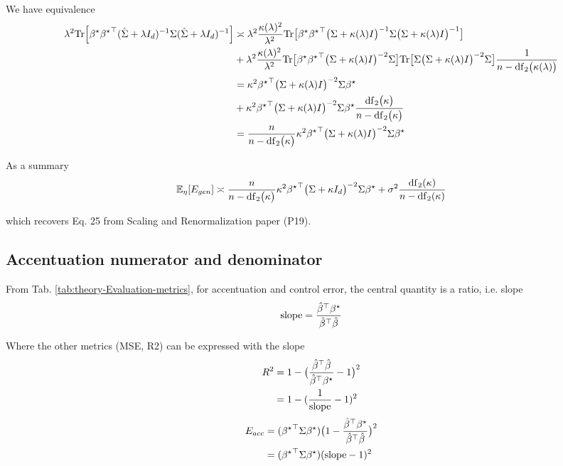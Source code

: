 \begin{minipage}[t]{1\columnwidth}
We have equivalence
\begin{align*}
\lambda^{2}\mathrm{Tr}\Big[{\beta^{\star}}{{\beta^{\star}}}^{\top}(\hat{\Sigma}+\lambda I_{d})^{-1}\Sigma(\hat{\Sigma}+\lambda I_{d})^{-1}\Big] & \asymp\lambda^{2}\frac{\kappa(\lambda)^{2}}{\lambda^{2}\,}\mbox{Tr}\bigl[{\beta^{\star}}{{\beta^{\star}}}^{\top}\bigl(\Sigma+\kappa(\lambda)I\bigr)^{-1}\Sigma\bigl(\Sigma+\kappa(\lambda)I\bigr)^{-1}\bigr]\\
 & +\lambda^{2}\frac{\kappa(\lambda)^{2}}{\lambda^{2}}\mbox{Tr}\bigl[{\beta^{\star}}{{\beta^{\star}}}^{\top}\bigl(\Sigma+\kappa(\lambda)I\bigr)^{-2}\Sigma\bigr]\mbox{Tr}\bigl[\Sigma\bigl(\Sigma+\kappa(\lambda)I\bigr)^{-2}\Sigma\bigr]\frac{1}{n-\mathrm{df}_{2}\bigl(\kappa(\lambda)\bigr)}\\
 & =\kappa^{2}{{\beta^{\star}}}^{\top}\bigl(\Sigma+\kappa(\lambda)I\bigr)^{-2}\Sigma{\beta^{\star}}\\
 & +\kappa^{2}{{\beta^{\star}}}^{\top}\bigl(\Sigma+\kappa(\lambda)I\bigr)^{-2}\Sigma{\beta^{\star}}\frac{\mathrm{df}_{2}\bigl(\kappa\bigr)}{n-\mathrm{df}_{2}\bigl(\kappa\bigr)}\\
 & =\frac{n}{n-\mathrm{df}_{2}\bigl(\kappa\bigr)}\kappa^{2}{{\beta^{\star}}}^{\top}\bigl(\Sigma+\kappa(\lambda)I\bigr)^{-2}\Sigma{\beta^{\star}}
\end{align*}

As a summary
\[
\mathbb{E}_{\eta}[E_{gen}]\asymp\frac{n}{n-\mathrm{df}_{2}\bigl(\kappa\bigr)}\kappa^{2}{{\beta^{\star}}}^{\top}\bigl(\Sigma+\kappa I_{d}\bigr)^{-2}\Sigma{\beta^{\star}}+\sigma^{2}\frac{\mathrm{df}_{2}(\kappa)}{n-\mathrm{df}_{2}(\kappa)}
\]

which recovers Eq. 25 from Scaling and Renormalization paper (P19).%
\end{minipage}



\subsection{Accentuation numerator and denominator}

From Tab. \ref{tab:theory-Evaluation-metrics}, for accentuation and
control error, the central quantity is a ratio, i.e. slope
\[
\mathrm{slope}=\frac{{\hat{\beta}}^{\top}{\beta^{\star}}}{{\hat{\beta}}^{\top}\hat{\beta}}
\]

Where the other metrics (MSE, R2) can be expressed with the slope
\begin{align*}
R^{2} & =1-\big(\frac{{\hat{\beta}}^{\top}\hat{\beta}}{{\hat{\beta}}^{\top}{\beta^{\star}}}-1\big)^{2}\\
 & =1-(\frac{1}{\mathrm{slope}}-1)^{2}
\end{align*}
\begin{align*}
E_{acc} & =({{\beta^{\star}}}^{\top}\Sigma{\beta^{\star}})\big(1-\frac{{\hat{\beta}}^{\top}{\beta^{\star}}}{{\hat{\beta}}^{\top}\hat{\beta}}\big)^{2}\\
 & =({{\beta^{\star}}}^{\top}\Sigma{\beta^{\star}})(\mathrm{slope}-1)^{2}
\end{align*}

